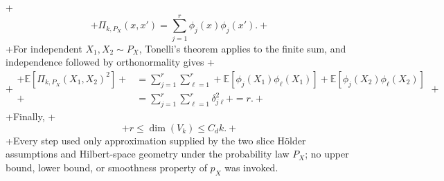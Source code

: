 +\[
+\Pi_{k,P_X}(x,x')=\sum_{j=1}^r\phi_j(x)\phi_j(x').
+\]
+For independent \(X_1,X_2\sim P_X\), Tonelli's theorem applies to the finite sum, and independence followed by orthonormality gives
+\[
+\begin{aligned}
+\mathbb E\!\left[\Pi_{k,P_X}(X_1,X_2)^2\right]
+&=\sum_{j=1}^r\sum_{\ell=1}^r
+\mathbb E[\phi_j(X_1)\phi_\ell(X_1)]
+\mathbb E[\phi_j(X_2)\phi_\ell(X_2)]\\
+&=\sum_{j=1}^r\sum_{\ell=1}^r\delta_{j\ell}^2
+=r.
+\end{aligned}
+\]
+Finally,
+\[
+r\le\dim(V_k)\le C_dk.
+\]
+Every step used only approximation supplied by the two slice H\"older assumptions and Hilbert-space geometry under the probability law \(P_X\); no upper bound, lower bound, or smoothness property of \(p_X\) was invoked.